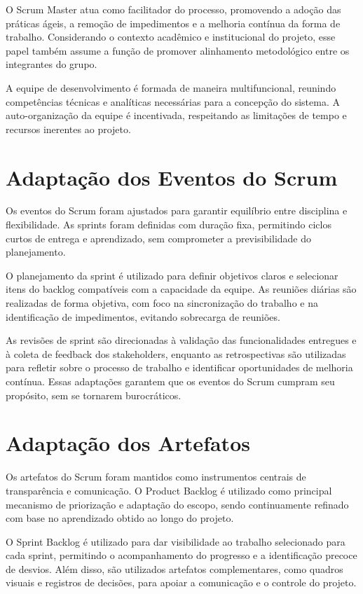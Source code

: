 O Scrum Master atua como facilitador do processo, promovendo a adoção das práticas ágeis, a remoção de impedimentos e a melhoria contínua da forma de trabalho. Considerando o contexto acadêmico e institucional do projeto, esse papel também assume a função de promover alinhamento metodológico entre os integrantes do grupo.

A equipe de desenvolvimento é formada de maneira multifuncional, reunindo competências técnicas e analíticas necessárias para a concepção do sistema. A auto-organização da equipe é incentivada, respeitando as limitações de tempo e recursos inerentes ao projeto.

\section{Adaptação dos Eventos do Scrum}

Os eventos do Scrum foram ajustados para garantir equilíbrio entre disciplina e flexibilidade. As sprints foram definidas com duração fixa, permitindo ciclos curtos de entrega e aprendizado, sem comprometer a previsibilidade do planejamento.

O planejamento da sprint é utilizado para definir objetivos claros e selecionar itens do backlog compatíveis com a capacidade da equipe. As reuniões diárias são realizadas de forma objetiva, com foco na sincronização do trabalho e na identificação de impedimentos, evitando sobrecarga de reuniões.

As revisões de sprint são direcionadas à validação das funcionalidades entregues e à coleta de feedback dos stakeholders, enquanto as retrospectivas são utilizadas para refletir sobre o processo de trabalho e identificar oportunidades de melhoria contínua. Essas adaptações garantem que os eventos do Scrum cumpram seu propósito, sem se tornarem burocráticos.

\section{Adaptação dos Artefatos}

Os artefatos do Scrum foram mantidos como instrumentos centrais de transparência e comunicação. O Product Backlog é utilizado como principal mecanismo de priorização e adaptação do escopo, sendo continuamente refinado com base no aprendizado obtido ao longo do projeto.

O Sprint Backlog é utilizado para dar visibilidade ao trabalho selecionado para cada sprint, permitindo o acompanhamento do progresso e a identificação precoce de desvios. Além disso, são utilizados artefatos complementares, como quadros visuais e registros de decisões, para apoiar a comunicação e o controle do projeto.

